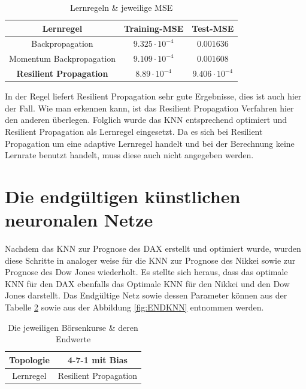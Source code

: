 \begin{table}[H]
  \centering
  \begin{tabular}{|c|c|c|}
  \hline 
  \rule[0ex]{0pt}{2.5ex} Lernregel & Training-MSE & Test-MSE \\ 
  \hline 
  \rule[0ex]{0pt}{2.5ex} Backpropagation & $9.325\cdot10^{-4}$ & $0.001636$ \\ 
  \hline 
  \rule[0ex]{0pt}{2.5ex} Momentum Backpropagation & $9.109\cdot10^{-4}$ & $0.001608$ \\ 
  \hline 
  \rule[0ex]{0pt}{2.5ex} \textbf{Resilient Propagation} & $8.89\cdot10^{-4}$ & $9.406\cdot10^{-4}$ \\ 
  \hline 
  \end{tabular} 
  \caption{Lernregeln \& jeweilige MSE}
  \label{tab:LERNregeln}
\end{table}

In der Regel liefert Resilient Propagation sehr gute Ergebnisse, dies ist auch hier der Fall. Wie man erkennen kann, ist das Resilient Propagation Verfahren  hier den anderen überlegen. Folglich wurde das KNN entsprechend optimiert und Resilient Propagation als Lernregel eingesetzt. Da es sich bei Resilient Propagation um eine adaptive Lernregel handelt und bei der Berechnung keine Lernrate benutzt handelt, muss diese auch nicht angegeben werden.

\section{Die endgültigen künstlichen neuronalen Netze}
\label{section:Die endgültigen künstlichen neuronalen Netze}

Nachdem das KNN zur Prognose des DAX erstellt und optimiert wurde, wurden diese Schritte in analoger weise für die KNN zur Prognose des Nikkei sowie zur Prognose des Dow Jones wiederholt.
Es stellte sich heraus, dass das optimale KNN für den DAX ebenfalls das Optimale KNN für den Nikkei und den Dow Jones darstellt. Das Endgültige Netz sowie dessen Parameter können aus der Tabelle \ref{tab:ENDconf} sowie aus der  Abbildung \ref{fig:ENDKNN} entnommen werden.

\begin{table}[H]
  \centering
  \begin{tabular}{|c|c|}
  \hline 
  \rule[0ex]{0pt}{2.5ex}  Topologie & 4-7-1 mit Bias\\ 
  \hline 
  \rule[0ex]{0pt}{2.5ex}  Lernregel & Resilient Propagation\\  
  \hline 
  \end{tabular} 
  \caption{Die jeweiligen Börsenkurse \& deren Endwerte}
  \label{tab:ENDconf}
\end{table}

